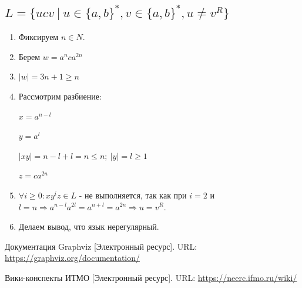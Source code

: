 \documentclass[a4paper,12pt]{article}
\begin{document}
\subsection{$L = \{ucv \: | \: u \in \{a, b\}^{*}, v \in \{a, b\}^*, u \neq v^R\}$}

\begin{enumerate}
    \item Фиксируем $n \in N$.
    \item Берем $w = a^nca^{2n}$
    \item $|w| = 3n + 1 \geq n$
    \item Рассмотрим разбиение:
    
    $x = a^{n - l}$
    
    $y = a^{l}$
    
    $|xy| = n - l + l = n \leq n; \: |y| = l \geq 1$
    
    $z = ca^{2n}$
    
    \item $\forall i \geq 0: xy^iz \in L$ - не выполняется, так как при $i = 2$ и $l = n \Rightarrow a^{n - l}a^{2l} = a^{n + l} = a^{2n} \Rightarrow u = v^R$.
    \item Делаем вывод, что язык нерегулярный.
\end{enumerate}

\newpage

\begin{thebibliography}{9}
     Документация Graphviz [Электронный ресурс]. URL: \url{https://graphviz.org/documentation/}
    
     Вики-конспекты ИТМО [Электронный ресурс]. URL: \url{https://neerc.ifmo.ru/wiki/}
\end{thebibliography}
\end{document}
